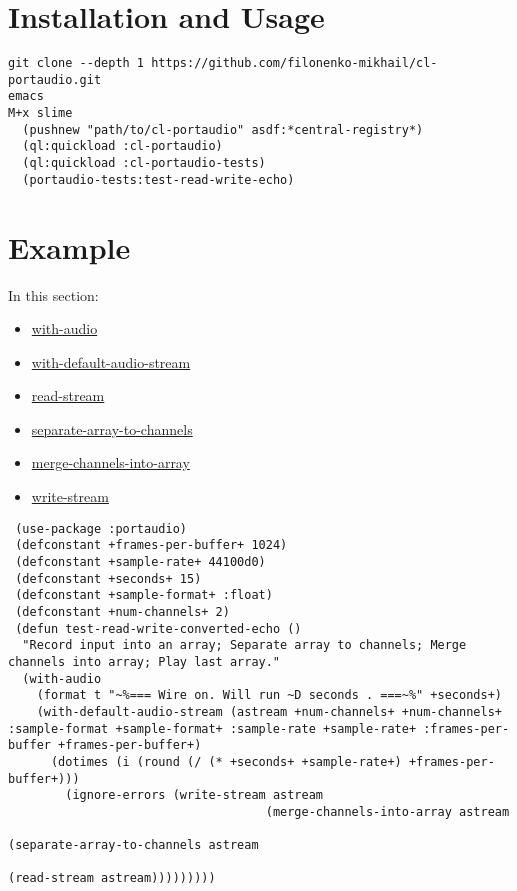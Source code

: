 \documentclass[a4paper]{report}
\begin{document}
\section{Installation and Usage} \label{d0d0e0e0e0e0}\begin{verbatim}
git clone --depth 1 https://github.com/filonenko-mikhail/cl-portaudio.git
emacs
M+x slime
  (pushnew "path/to/cl-portaudio" asdf:*central-registry*)
  (ql:quickload :cl-portaudio)
  (ql:quickload :cl-portaudio-tests)
  (portaudio-tests:test-read-write-echo)\end{verbatim}\section{Example} \label{d0d0e0e0e0e1}
      In this section:
      \begin{itemize}
      
	\item
	\hyperref[portaudio__fun__with-audio]{with-audio}
	    
	\item
	\hyperref[portaudio__fun__with-default-audio-stream]{with-default-audio-stream}
	    
	\item
	\hyperref[portaudio__fun__read-stream]{read-stream}
	    
	\item
	\hyperref[portaudio__fun__separate-array-to-channels]{separate-array-to-channels}
	    
	\item
	\hyperref[portaudio__fun__merge-channels-into-array]{merge-channels-into-array}
	    
	\item
	\hyperref[portaudio__fun__write-stream]{write-stream}
	    
      \end{itemize}
    \begin{verbatim}
 (use-package :portaudio)
 (defconstant +frames-per-buffer+ 1024)
 (defconstant +sample-rate+ 44100d0)
 (defconstant +seconds+ 15)
 (defconstant +sample-format+ :float)
 (defconstant +num-channels+ 2)
 (defun test-read-write-converted-echo ()
  "Record input into an array; Separate array to channels; Merge channels into array; Play last array." 
  (with-audio
    (format t "~%=== Wire on. Will run ~D seconds . ===~%" +seconds+) 
    (with-default-audio-stream (astream +num-channels+ +num-channels+ :sample-format +sample-format+ :sample-rate +sample-rate+ :frames-per-buffer +frames-per-buffer+) 
      (dotimes (i (round (/ (* +seconds+ +sample-rate+) +frames-per-buffer+)))
        (ignore-errors (write-stream astream
                                    (merge-channels-into-array astream
                                                               (separate-array-to-channels astream
                                                                                           (read-stream astream)))))))))\end{verbatim}
\end{document}
